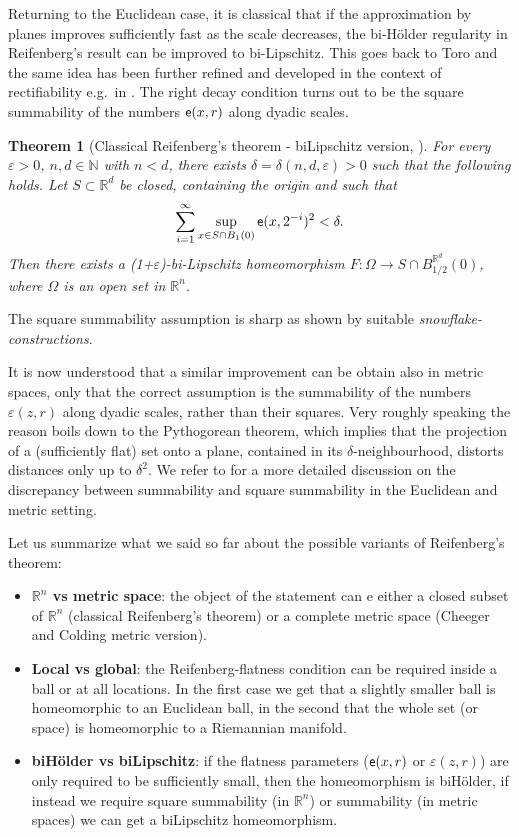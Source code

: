 \documentclass[11pt]{article}
\newcommand{\eps}{\varepsilon}
\newcommand{\rr}{\mathbb{R}}
\newcommand{\nn}{\mathbb{N}}
\newcommand{\ee}{{\sf e}}
\theoremstyle{plain}
\newtheorem{theorem}{Theorem}[section]
\theoremstyle{definition}
\numberwithin{equation}{section}
\begin{document}
Returning to the Euclidean case,  it is  classical that if the approximation by planes  improves sufficiently fast as the scale decreases, the bi-H\"older regularity  in Reifenberg's result can be improved to bi-Lipschitz. This  goes back to Toro \cite{toro} and the same idea has been further refined and developed in the context of rectifiability e.g.\ in \cite{DS,nv,env,holes}. The right decay  condition turns out to be the square summability of the numbers $\ee(x,r)$ along dyadic scales.
\begin{theorem}[{Classical Reifenberg's theorem - biLipschitz version, \cite{toro}}]\label{thm:toro}
	For every $\eps>0$, $n,d\in \nn$  with $n<d$, there exists $\delta=\delta(n,d,\eps)>0$ such that the following holds. Let $S\subset \rr^d$ be closed, containing the origin and such that
	\begin{equation}\label{eq:dini1}
		\sum_{i=1}^\infty \sup_{x \in S\cap B_1(0)} \ee(x,2^{-i})^2<\delta.
	\end{equation}
	Then there exists a (1+$\eps$)-bi-Lipschitz homeomorphism $F: \Omega\to S\cap B_{1/2}^{\rr^d}(0)$, where $\Omega$ is an open set in $\rr^n.$
\end{theorem}
The square summability assumption is  sharp as shown by suitable \emph{snowflake-constructions}. 

It is now understood that a similar improvement can be obtain also in metric spaces, only that the correct assumption is the summability of the numbers $\eps(z,r)$ along dyadic scales, rather than their squares. Very roughly speaking the reason boils down to the Pythogorean theorem, which implies that the projection of a (sufficiently flat) set onto a plane, contained in its $\delta$-neighbourhood, distorts distances only up to $\delta^2$. We refer to \cite{snow,Violoflat} for a more detailed discussion on the discrepancy between summability and square summability in the Euclidean and metric setting. 

Let us summarize what we said so far about the possible variants of Reifenberg's theorem:
\begin{itemize}
    \item \textbf{$\rr^n$ vs metric space}: the object of the statement can e either a closed subset of $\rr^n$ (classical Reifenberg's theorem) or a complete metric space (Cheeger and Colding metric version).
    \item \textbf{Local vs global}: the Reifenberg-flatness condition can be required inside a ball or at all locations. In the first case we get that a slightly smaller ball is homeomorphic to an Euclidean ball, in the second that the whole set (or space) is homeomorphic to a Riemannian manifold.
    \item \textbf{biH\"older vs biLipschitz}: if the flatness parameters  ($\ee(x,r)$ or $\eps(z,r)$) are only required to be sufficiently small, then the homeomorphism   is biH\"older, if instead we require square summability (in $\rr^n$) or summability (in metric spaces) we can get a biLipschitz homeomorphism.
\end{itemize}
\end{document}
